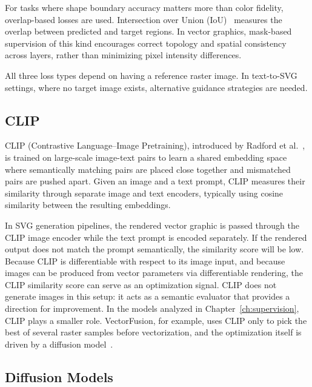 For tasks where shape boundary accuracy matters more than 
color fidelity, overlap-based losses are used. Intersection 
over Union (IoU)~\cite{everingham2010pascal} measures the 
overlap between predicted and target regions. In vector 
graphics, mask-based supervision of this kind encourages 
correct topology and spatial consistency across layers, 
rather than minimizing pixel intensity differences.

All three loss types depend on having a reference raster 
image. In text-to-SVG settings, where no target image 
exists, alternative guidance strategies are needed.

\subsection{CLIP}
\label{sec:clip}

CLIP (Contrastive Language--Image Pretraining), introduced 
by Radford et al.~\cite{radfordLearningTransferableVisual2021}, 
is trained on large-scale image-text pairs to learn a 
shared embedding space where semantically matching pairs 
are placed close together and mismatched pairs are pushed 
apart. Given an image and a text prompt, CLIP measures 
their similarity through separate image and text encoders, 
typically using cosine similarity between the resulting 
embeddings.

In SVG generation pipelines, the rendered vector graphic 
is passed through the CLIP image encoder while the text 
prompt is encoded separately. If the rendered output does 
not match the prompt semantically, the similarity score 
will be low. Because CLIP is differentiable with respect 
to its image input, and because images can be produced 
from vector parameters via differentiable rendering, the 
CLIP similarity score can serve as an optimization signal. 
CLIP does not generate images in this setup: it acts as 
a semantic evaluator that provides a direction for 
improvement. In the models analyzed in 
Chapter~\ref{ch:supervision}, CLIP plays a smaller role. 
VectorFusion, for example, uses CLIP only to pick the best 
of several raster samples before vectorization, and the 
optimization itself is driven by a diffusion 
model~\cite{jainVectorFusionTexttoSVGAbstracting2022}.

\subsection{Diffusion Models}

